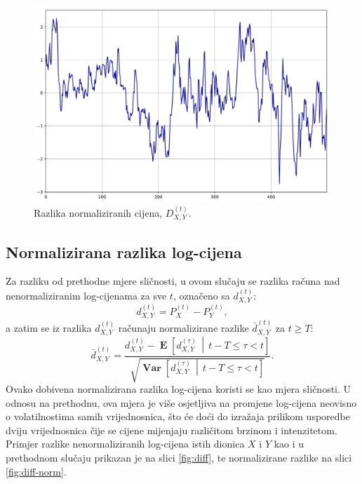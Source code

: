 \documentclass[lmodern, utf8, diplomski, numeric]{fer}
\newcommand{\Efromto}[2]{\operatorname{\mathbf{E}}\q[#1\, \middle\vert\, #2\w]}
\newcommand{\Varfromto}[2]{\operatorname{\mathbf{Var}}\q[#1\, \middle\vert\, #2\w]}
\newcommand{\norm}[1]{\bar{#1}}
\newcommand{\q}{\left}
\newcommand{\w}{\right}
\begin{document}
  \begin{figure}[p]
    \centering
    \includegraphics[width=1.0\linewidth]{graphics/ab-prices-norm-diff.pdf}
    \caption{
      Razlika normaliziranih cijena, $D_{X,Y}^{\q(t\w)}$.}
    \label{fig:ab-prices-norm-diff}
  \end{figure}
  
  \subsection{Normalizirana razlika log-cijena}
  Za razliku od prethodne mjere sličnosti, u ovom slučaju se razlika računa nad nenormaliziranim log-cijenama za sve $t$, označeno sa $d_{X,Y}^{\q(t\w)}$:
  \begin{equation}
  d_{X,Y}^{\q(t\w)} = P_X^{\q(t\w)} - P_Y^{\q(t\w)},
  \end{equation}
  a zatim se iz razlika $d_{X,Y}^{\q(t\w)}$ računaju normalizirane razlike $\norm{d}_{X,Y}^{\q(t\w)}$ za $t \ge T$:
  \begin{equation}
  \norm{d}_{X,Y}^{\q(t\w)} = \frac{d_{X,Y}^{\q(t\w)} - \Efromto{d_{X,Y}^{(\tau)}}{t-T \le \tau < t}}{\sqrt{\Varfromto{d_{X,Y}^{(\tau)}}{t-T \le \tau < t}}}.
  \end{equation}
  Ovako dobivena normalizirana razlika log-cijena koristi se kao mjera sličnosti.
  U odnosu na prethodnu, ova mjera je više osjetljiva na promjene log-cijena neovisno o volatilnostima samih vrijednosnica, što će doći do izražaja prilikom usporedbe dviju vrijednosnica čije se cijene mijenjaju različitom brzinom i intenzitetom.
  Primjer razlike nenormaliziranih log-cijena istih dionica $X$ i $Y$ kao i u prethodnom slučaju prikazan je na slici \ref{fig:diff}, te normalizirane razlike na slici \ref{fig:diff-norm}.
  
\end{document}
